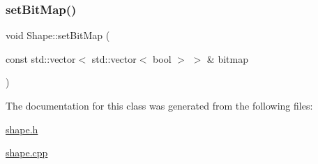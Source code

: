 \subsubsection{\texorpdfstring{set\+Bit\+Map()}{setBitMap()}}
{\footnotesize\ttfamily void Shape\+::set\+Bit\+Map (\begin{DoxyParamCaption}\item[{const std\+::vector$<$ std\+::vector$<$ bool $>$ $>$ \&}]{bitmap }\end{DoxyParamCaption})\hspace{0.3cm}{\ttfamily [virtual]}}



The documentation for this class was generated from the following files\+:\begin{DoxyCompactItemize}
\item 
\mbox{\hyperlink{shape_8h}{shape.\+h}}\item 
\mbox{\hyperlink{shape_8cpp}{shape.\+cpp}}\end{DoxyCompactItemize}
